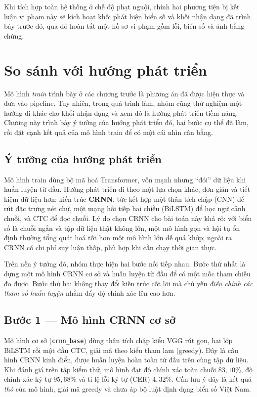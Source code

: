 \documentclass[12pt,a4paper]{report}
\begin{document}
Khi tích hợp toàn hệ thống ở chế độ phạt nguội, chính hai phương tiện bị kết luận vi phạm này sẽ kích hoạt khối phát hiện biển số và khối nhận dạng đã trình bày trước đó, qua đó hoàn tất một hồ sơ vi phạm gồm lỗi, biển số và ảnh bằng chứng.

\chapter{So sánh với hướng phát triển}

Mô hình \emph{train} trình bày ở các chương trước là phương án đã được hiện thực và đưa vào pipeline. Tuy nhiên, trong quá trình làm, nhóm cũng thử nghiệm một hướng đi khác cho khối nhận dạng và xem đó là hướng phát triển tiềm năng. Chương này trình bày ý tưởng của hướng phát triển đó, hai bước cụ thể đã làm, rồi đặt cạnh kết quả của mô hình train để có một cái nhìn cân bằng.

\section{Ý tưởng của hướng phát triển}
Mô hình train dùng bộ mã hoá Transformer, vốn mạnh nhưng ``đói'' dữ liệu khi huấn luyện từ đầu. Hướng phát triển đi theo một lựa chọn khác, đơn giản và tiết kiệm dữ liệu hơn: kiến trúc \textbf{CRNN}, tức kết hợp một thân tích chập (CNN) để rút đặc trưng nét chữ, một mạng hồi tiếp hai chiều (BiLSTM) để học ngữ cảnh chuỗi, và CTC để đọc chuỗi. Lý do chọn CRNN cho bài toán này khá rõ: với biển số là chuỗi ngắn và tập dữ liệu thật không lớn, một mô hình gọn và hội tụ ổn định thường tổng quát hoá tốt hơn một mô hình lớn dễ quá khớp; ngoài ra CRNN có chi phí suy luận thấp, phù hợp khi cần chạy thời gian thực.

Trên nền ý tưởng đó, nhóm thực hiện hai bước nối tiếp nhau. Bước thứ nhất là dựng một mô hình CRNN cơ sở và huấn luyện từ đầu để có một mốc tham chiếu đo được. Bước thứ hai không thay đổi kiến trúc cốt lõi mà chủ yếu \emph{điều chỉnh các tham số huấn luyện} nhằm đẩy độ chính xác lên cao hơn.

\section{Bước 1 --- Mô hình CRNN cơ sở}
Mô hình cơ sở (\texttt{crnn\_base}) dùng thân tích chập kiểu VGG rút gọn, hai lớp BiLSTM rồi một đầu CTC, giải mã theo kiểu tham lam (greedy). Đây là cấu hình CRNN kinh điển, được huấn luyện hoàn toàn từ đầu trên cùng tập dữ liệu. Khi đánh giá trên tập kiểm thử, mô hình đạt độ chính xác toàn chuỗi $83{,}10\%$, độ chính xác ký tự $95{,}68\%$ và tỉ lệ lỗi ký tự (CER) $4{,}32\%$. Cần lưu ý đây là kết quả \emph{thô} của mô hình, giải mã greedy và chưa áp bộ luật định dạng biển số Việt Nam.
\end{document}
